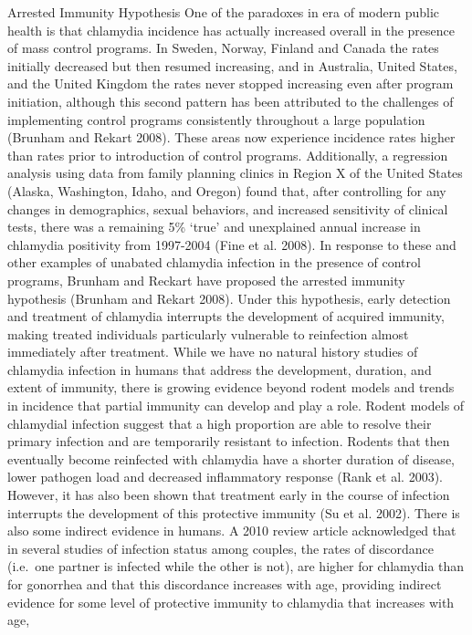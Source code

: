 \documentclass [11pt, proquest] {uwthesis}[2015/03/03]
\begin{document}
Arrested Immunity Hypothesis One of the paradoxes in era of modern
public health is that chlamydia incidence has actually increased overall
in the presence of mass control programs. In Sweden, Norway, Finland and
Canada the rates initially decreased but then resumed increasing, and in
Australia, United States, and the United Kingdom the rates never stopped
increasing even after program initiation, although this second pattern
has been attributed to the challenges of implementing control programs
consistently throughout a large population (Brunham and Rekart 2008).
These areas now experience incidence rates higher than rates prior to
introduction of control programs. Additionally, a regression analysis
using data from family planning clinics in Region X of the United States
(Alaska, Washington, Idaho, and Oregon) found that, after controlling
for any changes in demographics, sexual behaviors, and increased
sensitivity of clinical tests, there was a remaining 5\% `true' and
unexplained annual increase in chlamydia positivity from 1997-2004 (Fine
et al. 2008). In response to these and other examples of unabated
chlamydia infection in the presence of control programs, Brunham and
Reckart have proposed the arrested immunity hypothesis (Brunham and
Rekart 2008). Under this hypothesis, early detection and treatment of
chlamydia interrupts the development of acquired immunity, making
treated individuals particularly vulnerable to reinfection almost
immediately after treatment. While we have no natural history studies of
chlamydia infection in humans that address the development, duration,
and extent of immunity, there is growing evidence beyond rodent models
and trends in incidence that partial immunity can develop and play a
role. Rodent models of chlamydial infection suggest that a high
proportion are able to resolve their primary infection and are
temporarily resistant to infection. Rodents that then eventually become
reinfected with chlamydia have a shorter duration of disease, lower
pathogen load and decreased inflammatory response (Rank et al. 2003).
However, it has also been shown that treatment early in the course of
infection interrupts the development of this protective immunity (Su et
al. 2002). There is also some indirect evidence in humans. A 2010 review
article acknowledged that in several studies of infection status among
couples, the rates of discordance (i.e.~one partner is infected while
the other is not), are higher for chlamydia than for gonorrhea and that
this discordance increases with age, providing indirect evidence for
some level of protective immunity to chlamydia that increases with age,
\end{document}
